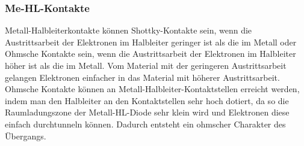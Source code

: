 \documentclass[a4paper, 12pt]{article}
\begin{document}
\subsubsection*{Me-HL-Kontakte}
Metall-Halbleiterkontakte können Shottky-Kontakte sein, wenn die Austrittsarbeit
der Elektronen im Halbleiter geringer ist als die im Metall oder Ohmsche
Kontakte sein, wenn die Austrittsarbeit der Elektronen im Halbleiter höher ist
als die im Metall. Vom Material mit der geringeren Austrittsarbeit gelangen
Elektronen einfacher in das Material mit höherer Austrittsarbeit.
Ohmsche Kontakte können an Metall-Halbleiter-Kontaktstellen erreicht werden,
indem man den Halbleiter an den Kontaktstellen sehr hoch dotiert, da so die
Raumladungszone der Metall-HL-Diode sehr klein wird und Elektronen diese einfach
durchtunneln können. Dadurch entsteht ein ohmscher Charakter des Übergangs.
\end{document}
